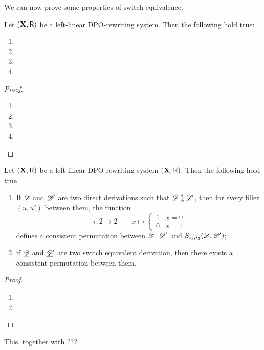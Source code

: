 We can now prove some properties of switch equivalence.
\begin{lemma}Let $(\textbf {\textup{X}}, \mathsf{R})$ be a left-linear DPO-rewriting system. Then the following hold true: 
	\begin{enumerate}
		\item 
		\item 
		\item 
		\item 
	\end{enumerate}
\end{lemma}
\begin{proof}\begin{enumerate}
		\item 
		\item 
		\item 
		\item \qedhere 
	\end{enumerate}
\end{proof}


\begin{example}
\end{example}



\begin{lemma}\label{lem:consperm} Let $(\textbf {\textup{X}}, \mathsf{R})$ be a left-linear DPO-rewriting system $(\textbf {\textup{X}}, \mathsf{R})$. Then the following hold true
	\begin{enumerate}
		\item If $\mathscr{D}$ and $\mathscr{D'}$ are two direct derivations such that $\mathscr{D}\updownarrow \mathscr{D'}$, then for every filler $(u,u')$ between them, the function
		\[\tau\colon 2\to2 \qquad x \mapsto \begin{cases}
			1 & x=0\\
			0 & x=1
		\end{cases}\]
		defines a consistent permutation between $\mathscr{D}\cdot \mathscr{D}'$ and $S_{i_1,i_2}(\mathscr{D}, \mathscr{D'})$;
		\item if $\underline{\mathscr{D}}$ and $\underline{\mathscr{D}}'$ are two switch equivalent derivation, then there exists a consistent permutation between them.
	\end{enumerate}
\end{lemma}
\begin{proof}
	\begin{enumerate}
		\item 
		\item \qedhere 
	\end{enumerate}
\end{proof}
 This, together with ???
\begin{corollary}
\end{corollary}

